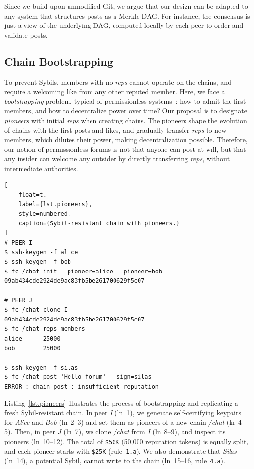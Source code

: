 \documentclass[10pt,twocolumn]{article}
\newcommand{\R}[1]     {rule~\code{#1}\xspace}
\newcommand{\reps}     {\emph{reps}\xspace}
\newcommand{\nreps}[1] {\code{\$#1\xspace}}
\newcommand{\code}[1]  {\texttt{\small{#1}}}
\begin{document}
Since we build upon unmodified Git, we argue that our design can be adapted to
any system that structures posts as a Merkle DAG.
For instance, the consensus is just a view of the underlying DAG, computed
locally by each peer to order and validate posts.

\subsection{Chain Bootstrapping}
\label{sec.design.boot}

To prevent Sybils, members with no \reps cannot operate on the chains, and
require a welcoming like from any other reputed member.
%
Here, we face a \emph{bootstrapping} problem, typical of permissionless
systems~\cite{rep.pseudonyms,p2p.sybil,p2p.bitcoin}:
    how to admit the first members,
    and how to decentralize power over time?
%
Our proposal is to designate \emph{pioneers} with initial \reps when creating
chains.
The pioneers shape the evolution of chains with the first posts and likes, and
gradually transfer \reps to new members, which dilutes their power, making
decentralization possible.
%
Therefore, our notion of permissionless forums is not that anyone can post at
will, but that any insider can welcome any outsider by directly transferring
\reps, without intermediate authorities.

\begin{lstlisting}[
    float=t,
    label={lst.pioneers},
    style=numbered,
    caption={Sybil-resistant chain with pioneers.}
]
# PEER I
$ ssh-keygen -f alice
$ ssh-keygen -f bob
$ fc /chat init --pioneer=alice --pioneer=bob
09ab434cde2924de9ac83fb5be261700629f5e07

# PEER J
$ fc /chat clone I
09ab434cde2924de9ac83fb5be261700629f5e07
$ fc /chat reps members
alice      25000
bob        25000

$ ssh-keygen -f silas
$ fc /chat post 'Hello forum' --sign=silas
ERROR : chain post : insufficient reputation
\end{lstlisting}

Listing~\ref{lst.pioneers} illustrates the process of bootstrapping and
replicating a fresh Sybil-resistant chain.
%
In peer \emph{I} (ln~1), we generate self-certifying keypairs for \emph{Alice}
and \emph{Bob} (ln~2--3) and set them as pioneers of a new chain \emph{/chat}
(ln~4--5).
%
Then, in peer \emph{J} (ln~7), we clone \emph{/chat} from \emph{I} (ln~8--9),
and inspect its pioneers (ln~10--12).
The total of \nreps{50K} (50,000 reputation tokens) is equally split, and each
pioneer starts with \nreps{25K} (\R{1.a}).
We also demonstrate that \emph{Silas} (ln~14), a potential Sybil, cannot write
to the chain (ln~15--16, \R{4.a}).
\end{document}
